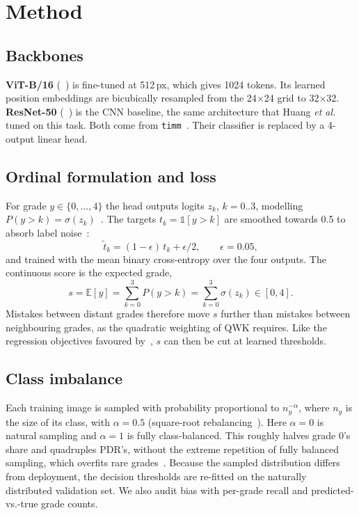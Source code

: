 \documentclass[conference,a4paper]{IEEEtran}
\begin{document}
\section{Method}
\subsection{Backbones}
\textbf{ViT-B/16} (~\cite{augreg}) is fine-tuned at 512\,px, which gives 1024 tokens. Its learned position embeddings are bicubically resampled from the 24$\times$24 grid to 32$\times$32.
\textbf{ResNet-50} (~\cite{resnet}) is the CNN baseline, the same architecture that Huang \emph{et al.}~\cite{huang} tuned on this task.
Both come from \texttt{timm}~\cite{timm}. Their classifier is replaced by a 4-output linear head.

\subsection{Ordinal formulation and loss}\label{sec:loss}
For grade $y\in\{0,\dots,4\}$ the head outputs logits $z_k$, $k=0..3$, modelling $P(y>k)=\sigma(z_k)$~\cite{frankhall,coral}.
The targets $t_k=\mathbb{1}[y>k]$ are smoothed towards 0.5 to absorb label noise~\cite{smoothing}:
\begin{equation}
\tilde t_k = (1-\epsilon)\,t_k + \epsilon/2,\qquad \epsilon = 0.05,
\end{equation}
and trained with the mean binary cross-entropy over the four outputs.
The continuous score is the expected grade,
\begin{equation}
s = \mathbb{E}[y] = \sum_{k=0}^{3} P(y>k) = \sum_{k=0}^{3}\sigma(z_k)\in[0,4].
\end{equation}
Mistakes between distant grades therefore move $s$ further than mistakes between neighbouring grades, as the quadratic weighting of QWK requires.
Like the regression objectives favoured by~\cite{huang}, $s$ can then be cut at learned thresholds.

\subsection{Class imbalance}
Each training image is sampled with probability proportional to $n_{y}^{-\alpha}$, where $n_y$ is the size of its class, with $\alpha=0.5$ (square-root rebalancing~\cite{kang}).
Here $\alpha=0$ is natural sampling and $\alpha=1$ is fully class-balanced.
This roughly halves grade 0's share and quadruples PDR's, without the extreme repetition of fully balanced sampling, which overfits rare grades~\cite{huang}.
Because the sampled distribution differs from deployment, the decision thresholds are re-fitted on the naturally distributed validation set. We also audit bias with per-grade recall and predicted-vs.-true grade counts.
\end{document}
